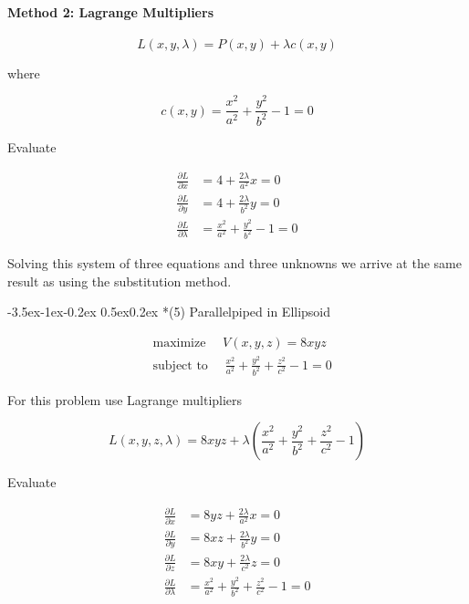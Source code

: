 \documentclass[11pt,letterpaper,onecolumn,notitlepage]{article}
\makeatletter
\renewcommand\subsection{\@startsection{subsection}{1}{\z@}%
{-3.5ex\@plus-1ex\@minus-0.2ex}%
{0.5ex\@plus0.2ex}%
{\fontsize{10pt}{10pt}\selectfont\bfseries\sffamily}}
\makeatother
\begin{document}
\paragraph{Method 2: Lagrange Multipliers}

\begin{equation*}
  L(x,y,\lambda)=P(x,y)+\lambda c(x,y)
\end{equation*}

where

\begin{equation*}
  c(x,y)=\frac{x^{2}}{a^{2}}+\frac{y^{2}}{b^{2}}-1=0
\end{equation*}

Evaluate

\begin{align*}
  \frac{\partial L}{\partial x}&=4+\frac{2\lambda}{a^{2}}x=0 \\
  \frac{\partial L}{\partial y}&=4+\frac{2\lambda}{b^{2}}y=0 \\
  \frac{\partial L}{\partial\lambda}&=\frac{x^{2}}{a^{2}}+\frac{y^{2}}{b^{2}}-1=0
\end{align*}

Solving this system of three equations and three unknowns we arrive at the same result as using the substitution method.

\subsection*{(5) Parallelpiped in Ellipsoid}

\begin{align*}
  &\text{maximize }\quad V(x,y,z)=8xyz \\
  &\text{subject to }\quad\frac{x^{2}}{a^{2}}+\frac{y^{2}}{b^{2}}+\frac{z^{2}}{c^{2}}-1=0
\end{align*}

For this problem use Lagrange multipliers

\begin{equation*}
  L(x,y,z,\lambda)=8xyz+\lambda\left(\frac{x^{2}}{a^{2}}+\frac{y^{2}}{b^{2}}+\frac{z^{2}}{c^{2}}-1\right)
\end{equation*}

Evaluate

\begin{align*}
  \frac{\partial L}{\partial x}&=8yz+\frac{2\lambda}{a^{2}}x=0 \\
  \frac{\partial L}{\partial y}&=8xz+\frac{2\lambda}{b^{2}}y=0 \\
  \frac{\partial L}{\partial z}&=8xy+\frac{2\lambda}{c^{2}}z=0 \\
  \frac{\partial L}{\partial\lambda}&=\frac{x^{2}}{a^{2}}+\frac{y^{2}}{b^{2}}+\frac{z^{2}}{c^{2}}-1=0
\end{align*}
\end{document}
